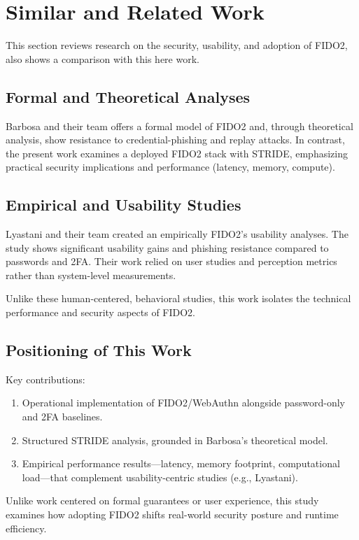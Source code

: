 \section{Similar and Related Work}\label{sec:related}

This section reviews research on the security, usability, and adoption of FIDO2, also shows a comparison with this here work.

\subsection{Formal and Theoretical Analyses}
Barbosa and their team \cite{barbosa2021provable} offers a formal model of FIDO2 and, through theoretical analysis, show resistance to credential-phishing and replay attacks. In contrast, the present work examines a deployed FIDO2 stack with STRIDE, emphasizing practical security implications and performance (latency, memory, compute).


\subsection{Empirical and Usability Studies}
Lyastani and their team \cite{lyastani2020kingslayer} created an empirically FIDO2's usability analyses. The study shows significant usability gains and phishing resistance compared to passwords and 2FA. Their work relied on user studies and perception metrics rather than system-level measurements.

Unlike these human-centered, behavioral studies, this work isolates the technical performance and security aspects of FIDO2.

\subsection{Positioning of This Work}
Key contributions:
\begin{enumerate}
    \item Operational implementation of FIDO2/WebAuthn alongside password-only and 2FA baselines.
    \item Structured STRIDE analysis, grounded in Barbosa’s theoretical model.
    \item Empirical performance results—latency, memory footprint, computational load—that complement usability-centric studies (e.g., Lyastani).
\end{enumerate}

Unlike work centered on formal guarantees or user experience, this study examines how adopting FIDO2 shifts real-world security posture and runtime efficiency.
